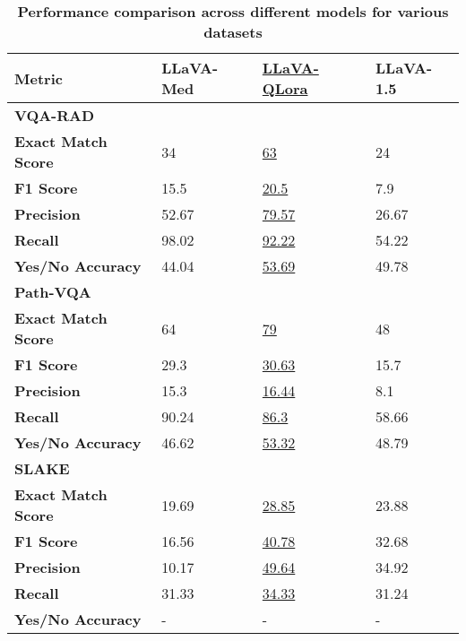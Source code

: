 \documentclass[10pt,letterpaper]{article}
\begin{document}
\begin{table}[ht]
    \centering
    \caption{\bf Performance comparison across different models for various datasets}
    \begin{tabular}{@{}l|l|l|l@{}}
        \toprule
        \textbf{Metric} & \textbf{LLaVA-Med} & \underline{\textbf{LLaVA-QLora}} & \textbf{LLaVA-1.5} \\
        \hline
        \textbf{VQA-RAD} \\
        \midrule
        \textbf{Exact Match Score} & 34 & \underline{63} & 24 \\
        \hline
        \textbf{F1 Score} & 15.5 & \underline{20.5} & 7.9 \\
        \hline
        \textbf{Precision} & 52.67 & \underline{79.57} & 26.67 \\
        \hline
        \textbf{Recall} & 98.02 & \underline{92.22} & 54.22 \\
        \hline
        \textbf{Yes/No Accuracy} & 44.04 & \underline{53.69} & 49.78 \\
        \hline
        \textbf{Path-VQA} \\
        \midrule
        \textbf{Exact Match Score} & 64 & \underline{79} & 48 \\
        \hline
        \textbf{F1 Score} & 29.3 & \underline{30.63} & 15.7 \\
        \hline
        \textbf{Precision} & 15.3 & \underline{16.44} & 8.1 \\
        \hline
        \textbf{Recall} & 90.24 & \underline{86.3} & 58.66 \\
        \hline
        \textbf{Yes/No Accuracy} & 46.62 & \underline{53.32} & 48.79 \\
        \hline
        \textbf{SLAKE} \\
        \hline
        \textbf{Exact Match Score} & 19.69 & \underline{28.85} & 23.88 \\
        \hline
        \textbf{F1 Score} & 16.56 & \underline{40.78} & 32.68 \\
        \hline
        \textbf{Precision} & 10.17 & \underline{49.64} & 34.92 \\
        \hline
        \textbf{Recall} & 31.33 & \underline{34.33} & 31.24 \\
        \hline
        \textbf{Yes/No Accuracy} & - & - & - \\ %
        \hline
    \end{tabular}
    \label{tab:5}
\end{table}
\end{document}
